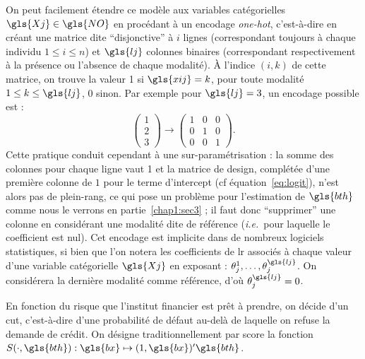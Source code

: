 On peut facilement étendre ce modèle aux variables catégorielles $\gls{Xj} \in \gls{NO}$ en procédant à un encodage \textit{one-hot}, c'est-à-dire en créant une matrice dite ``disjonctive'' à $i$ lignes (correspondant toujours à chaque individu $1 \leq i \leq n$) et $\gls{lj}$ colonnes binaires (correspondant respectivement à la présence ou l'absence de chaque modalité). \`A l'indice $(i,k)$ de cette matrice, on trouve la valeur 1 si $\gls{xij} = k$, pour toute modalité $1 \leq k \leq \gls{lj}$, 0 sinon. Par exemple pour $\gls{lj}=3$, un encodage possible est :
$$ \left( \begin{array}{c} 1 \\ 2 \\ 3 \end{array} \right) \to \left( \begin{array}{ccc} 1 & 0 & 0 \\ 0 & 1 & 0 \\ 0 & 0 & 1 \end{array} \right).$$
Cette pratique conduit cependant à une sur-paramétrisation : la somme des colonnes pour chaque ligne vaut 1 et la matrice de design, complétée d'une première colonne de $1$ pour le terme d'intercept (cf équation~\eqref{eq:logit}), n'est alors pas de plein-rang, ce qui pose un problème pour l'estimation de $\gls{bth}$ comme nous le verrons en partie~\ref{chap1:sec3} ; il faut donc ``supprimer'' une colonne en considérant une modalité dite de référence (\textit{i.e.}\ pour laquelle le coefficient est nul). Cet encodage est implicite dans de nombreux logiciels statistiques, si bien que l'on notera les coefficients de \gls{lr} associés à chaque valeur d'une variable catégorielle $\gls{Xj}$ en exposant : $\theta_j^{1},\dots,\theta_j^{\gls{lj}}$. On considérera la dernière modalité comme référence, d'où $\theta_j^{\gls{lj}} = 0$.

En fonction du risque que l'institut financier est prêt à prendre, on décide d'un \gls{cut}, c'est-à-dire d'une probabilité de défaut au-delà de laquelle on refuse la demande de crédit. On désigne traditionnellement par \gls{score} la fonction $S(\cdot,\gls{bth}): \gls{bx} \mapsto (1,\gls{bx})' \gls{bth}$.

